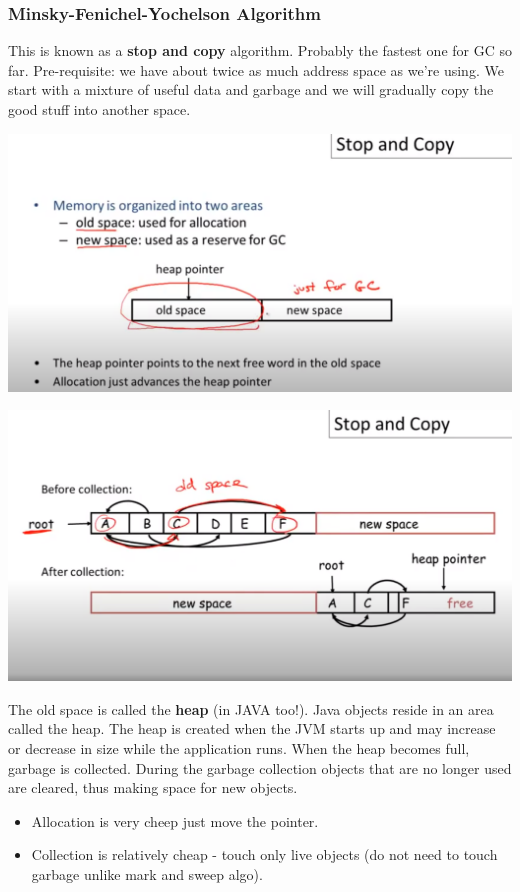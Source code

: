 \documentclass[a4paper,twoside]{article}
\numberwithin{equation}{section}
\begin{document}
\subsubsection{Minsky-Fenichel-Yochelson Algorithm}
This is known as a \textbf{stop and copy} algorithm. Probably the fastest one for GC so far.
Pre-requisite: we have about twice as much address space as we're using.
We start with a mixture of useful data and garbage and we will gradually copy the good stuff into another space.
\begin{center}
    \includegraphics[scale = 0.3]{assets/stop_copy_strategy.png}
\end{center}
\begin{center}
    \includegraphics[scale = 0.3]{assets/stop_copy.png}
\end{center}
The old space is called the \textbf{heap} (in JAVA too!).
Java objects reside in an area called the heap. The heap is created when the JVM starts up and may
increase or decrease in size while the application runs. When the heap becomes full, garbage is collected.
During the garbage collection objects that are no longer used are cleared, thus making space for new objects.
\begin{itemize}
    \item Allocation is very cheep just move the pointer.
    \item Collection is relatively cheap - touch only live objects (do not need to touch garbage unlike mark and sweep algo).
\end{itemize}
\end{document}
